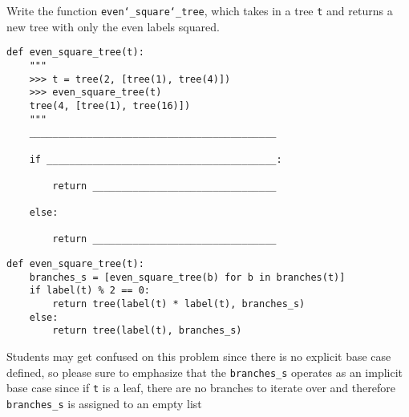 \begin{blocksection}
\question Write the function \texttt{even\char`_square\char`_tree}, which takes in a
tree \texttt{t} and returns a new tree with only the even labels squared.
\end{blocksection}

\begin{lstlisting}
def even_square_tree(t):
    """
    >>> t = tree(2, [tree(1), tree(4)])
    >>> even_square_tree(t)
    tree(4, [tree(1), tree(16)])
    """
    ___________________________________________

    if ________________________________________:

        return ________________________________

    else:

        return ________________________________

\end{lstlisting}

\begin{solution}
\begin{lstlisting}
def even_square_tree(t):
    branches_s = [even_square_tree(b) for b in branches(t)]
    if label(t) % 2 == 0:
        return tree(label(t) * label(t), branches_s)
    else:
        return tree(label(t), branches_s)
\end{lstlisting}
\end{solution}

\begin{questionmeta}
    Students may get confused on this problem since there is no explicit base case defined,
    so please sure to emphasize that the \lstinline{branches_s} operates as an implicit base case
    since if \lstinline{t} is a leaf, there are no branches to iterate over and therefore \lstinline{branches_s}
    is assigned to an empty list
\end{questionmeta}
